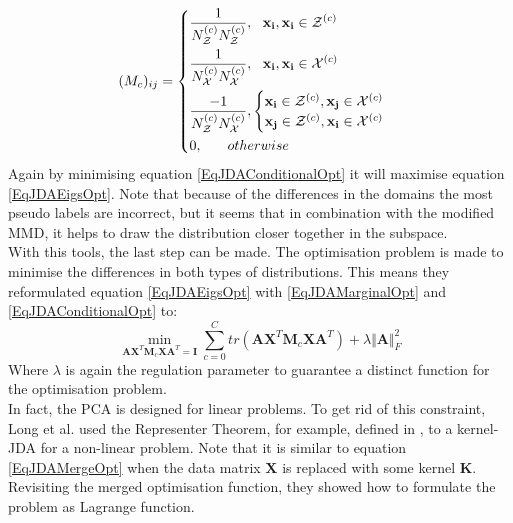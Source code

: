 \begin{equation}\label{EqJDAMMDPseudoMatrix}
(M_c)_{ij}= \begin{dcases}
\frac{1}{N_\mathcal{Z}^{(c)} N_\mathcal{Z}^{(c)} },\>\>\> \mathbf{x_i},\mathbf{x_i} \in \mathcal{Z}^{(c)} \\
\frac{1}{N_\mathcal{X}^{(c)}  N_\mathcal{X}^{(c)}  },\>\>\> \mathbf{x_i},\mathbf{x_i} \in \mathcal{X}^{(c)} \\
\frac{-1}{N_\mathcal{Z} ^{(c)} N_\mathcal{X} ^{(c)} }, \begin{cases}
\mathbf{x_i} \in \mathcal{Z}^{(c)}, \mathbf{x_j} \in \mathcal{X}^{(c)}\\
\mathbf{x_j} \in \mathcal{Z}^{(c)}, \mathbf{x_i} \in \mathcal{X}^{(c)}\\
\end{cases}\\
0,\>\>\>\>\>\>\>\> otherwise
\end{dcases}
\end{equation}
Again by minimising equation \eqref{EqJDAConditionalOpt} it will maximise equation \eqref{EqJDAEigsOpt}.
Note that because of the differences in the domains the most pseudo labels are incorrect, but it seems that in combination with the modified \acs{MMD}, it helps to draw the distribution closer together in the subspace.\cite{Long.}\\
With this tools, the last step can be made.
The optimisation problem is made to minimise the differences in both types of distributions.
This means they reformulated equation \eqref{EqJDAEigsOpt} with \eqref{EqJDAMarginalOpt} and \eqref{EqJDAConditionalOpt} to:\cite{Long.}
\begin{equation}\label{EqJDAMergeOpt}
\min_{\mathbf{A}\mathbf{X}^T\mathbf{M}_c\mathbf{X}\mathbf{A}^T=\mathbf{I}} \sum_{c=0}^{C} tr(\mathbf{A}\mathbf{X}^T\mathbf{M}_c\mathbf{X}\mathbf{A}^T) + \lambda \Vert\mathbf{A}\Vert^2_F
\end{equation}
Where $\lambda$ is again the regulation parameter to guarantee a distinct function for the optimisation problem.\\
In fact, the \acs{PCA} is designed for linear problems.\cite[p. 428-429]{Scholkopf.2001}
To get rid of this constraint, Long et al. used the Representer Theorem, for example, defined in \cite[p. 90]{Scholkopf.2001}, to a kernel-\acs{JDA} for a non-linear problem.
Note that it is similar to equation \eqref{EqJDAMergeOpt} when the data matrix $\mathbf{X}$ is replaced with some kernel $\mathbf{K}$.
Revisiting the merged optimisation function, they showed how to formulate the problem as Lagrange function.
